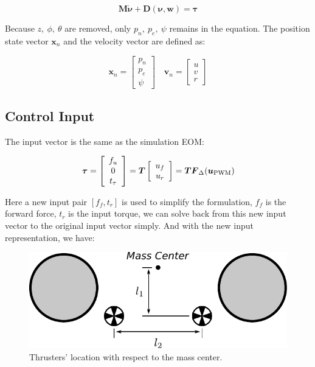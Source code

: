 \begin{equation}
    \boldsymbol{M}\dot{\boldsymbol{\nu}}+\boldsymbol{D}(\boldsymbol{\nu}, \boldsymbol{w})=\boldsymbol{\tau}
\end{equation}

Because $z,\ \phi,\ \theta$ are removed, only $p_n,\ p_e,\ \psi$ remains in the equation. The position state vector $\boldsymbol{x}_n$ and the velocity vector are defined as:

\begin{equation}
    \boldsymbol{x}_n=\left[\begin{array}{c}
        p_n  \\
        p_e  \\
        \psi
    \end{array}\right] \quad \boldsymbol{v}_n=\left[\begin{array}{c}
        u  \\
        v  \\
        r
    \end{array}\right]
\end{equation}

\subsection{Control Input}

The input vector is the same as the simulation EOM:

\begin{equation}
    \boldsymbol{\tau}=\left[\begin{array}{c}
        f_u  \\
        0 \\
        t_\tau
    \end{array}\right]=\boldsymbol{T}\left[\begin{array}{c}
        u_f  \\
        u_r 
    \end{array}\right]=\boldsymbol{T}\boldsymbol{F}_\Delta(\boldsymbol{u}_{\rm PWM})
\end{equation}

Here a new input pair $[f_f, t_r]$ is used to simplify the formulation, $f_f$ is the forward force, $t_r$ is the input torque, we can solve back from this new input vector to the original input vector simply. And with the new input representation, we have:

\begin{figure}
    \centering
    \includegraphics[width=.8\textwidth]{images/05input-loc.pdf}
    \caption{Thrusters' location with respect to the mass center.}
    \label{fig:05input-loc}
\end{figure}

